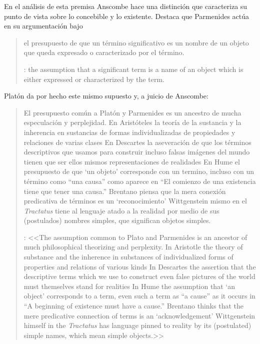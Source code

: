 En el análisis de esta premisa Anscombe hace una distinción que caracteriza su punto de vista sobre lo concebible y lo existente. Destaca que Parmenides actúa en su argumentación bajo \blockquote[{\cite[x]{anscombe1981parmenides}}: \textelp{} the assumption that a significant term is a name of an object which is either expressed or characterized by the term.]{\textelp{} el presupuesto de que un término significativo es un nombre de un objeto que queda expresado o caracterizado por el término.}  Platón da por hecho este mismo supuesto y, a juicio de Anscombe: \blockquote[{\cite[xi]{anscombe1981parmenides}}: <<The assumption common to Plato and Parmenides is an ancestor of much philosophical theorizing and perplexity. In Aristotle \textelp{} the theory of substance and the inherence in substances of individualized forms of properties and relations of various kinds \textelp{} In Descartes \textelp{} the assertion that the descriptive terms which we use to construct even false pictures of the world must themselves stand for realities \textelp{} In Hume \textelp{} the assumption that `an object' corresponds to a term, even such a term as ``a cause'' as it occurs in ``A beginning of existence must have a cause.'' \textelp{} Brentano thinks that the mere predicative connection of terms is an `acknowledgement' \textelp{} Wittgenstein himself in the \emph{Tractatus} has language pinned to reality by its (postulated) simple names, which mean simple objects.>>]{El presupuesto común a Platón y Parmenides es un ancestro de mucha especulación y perplejidad. En Aristóteles \textelp{} la teoría de la sustancia y la inherencia en sustancias de formas individualizadas de propiedades y relaciones de varias clases \textelp{} En Descartes \textelp{} la aseveración de que los términos descriptivos que usamos para construir incluso falsas imágenes del mundo tienen que ser ellos mismos representaciones de realidades \textelp{} En Hume \textelp{} el presupuesto de que `un objeto' corresponde con un termino, incluso con un término como ``una causa'' como aparece en ``El comienzo de una existencia tiene que tener una causa.'' \textelp{} Brentano piensa que la mera conexión predicativa de términos es un `reconocimiento' \textelp{} Wittgenstein mismo en el \emph{Tractatus} tiene al lenguaje atado a la realidad por medio de sus (postulados) nombres simples, que significan objetos simples.}

